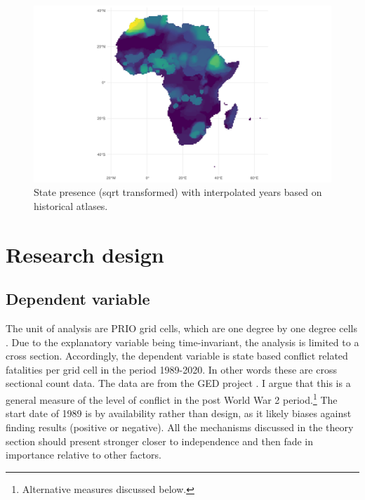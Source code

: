 \documentclass[12pt]{article}
\begin{document}

\begin{figure}[htpb]
	\centering
	\includegraphics[width=\linewidth]{../R/Output/sqrtSpAll.pdf}
	\caption{State presence (sqrt transformed) with interpolated years based
	on historical atlases.}
	\label{Sp_i}
\end{figure}



\section{Research design}

\subsection{Dependent variable}

The unit of analysis are PRIO grid cells, which are one degree by one degree
cells \citep{Tollefsen2012}. Due to the explanatory variable being
time-invariant, the analysis is limited to a cross section. Accordingly, the
dependent variable is state based conflict related fatalities per grid cell in
the period 1989-2020. In other words these are cross sectional count data. The
data are from the GED project \citep{Sundberg2013}. I argue that this is a
general measure of the level of conflict in the post World War 2
period.\footnote{Alternative measures discussed below.} The start date of 1989 is by
availability rather than design, as it likely biases against finding results
(positive or negative). All the mechanisms discussed in the theory section
should present stronger closer to independence and then fade in importance
relative to other factors. 
\end{document}

